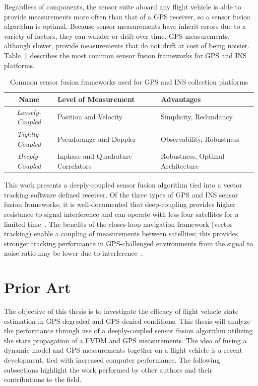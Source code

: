 Regardless of components, the sensor suite aboard any flight vehicle is able to provide measurements more often than that of a GPS receiver, so a sensor fusion algorithm is optimal. Because sensor measurements have inherit errors due to a variety of factors, they can wander or drift over time. GPS measurements, although slower, provide measurements that do not drift at cost of being noisier. Table~\ref{tbl:sensorfusionframeworks} describes the most common sensor fusion frameworks for GPS and INS platforms.
\begin{table}[!ht]\label{tbl:sensorfusionframeworks}
    \caption{Common sensor fusion frameworks used for GPS and INS collection platforms}
    \centering
    \begin{tabular}{cll}
        \toprule
        \textbf{Name}            & \textbf{Level of Measurement}      & \textbf{Advantages}              \\
        \midrule
        \textit{Loosely-Coupled} & Position and Velocity              & Simplicity, Redundancy           \\
        \textit{Tightly-Coupled} & Pseudorange and Doppler            & Observability, Robustness        \\
        \textit{Deeply-Coupled}  & Inphase and Quadrature Correlators & Robustness, Optimal Architecture \\
        \bottomrule
    \end{tabular}
\end{table}
This work presents a deeply-coupled sensor fusion algorithm tied into a vector tracking software defined receiver. Of the three types of GPS and INS sensor fusion frameworks, it is well-documented that deep-coupling provides higher resistance to signal interference and can operate with less four satellites for a limited time~\cite{wattsGPSGLONASSL12019}. The benefits of the closes-loop navigation framework (vector tracking) enable a coupling of measurements between satellites; this provides stronger tracking performance in GPS-challenged environments from the signal to noise ratio may be lower due to interference~\cite{grierPositionNavigationTiming}.
\section{\textbf{Prior Art}}
The objective of this thesis is to investigate the efficacy of flight vehicle state estimation in GPS-degraded and GPS-denied conditions. This thesis will analyze the performance through use of a deeply-coupled sensor fusion algorithm utilizing the state propagation of a FVDM and GPS measurements. The idea of fusing a dynamic model and GPS measurements together on a flight vehicle is a recent development, tied with increased computer performance. The following subsections highlight the work performed by other authors and their contributions to the field.
